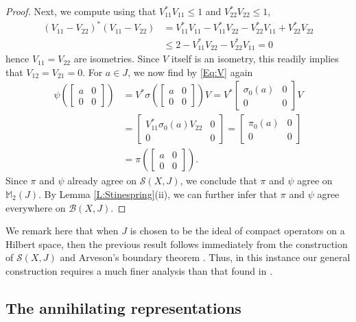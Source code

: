 \documentclass[10pt]{amsart}
\newcommand{\bM}{{\mathbb{M}}}
\newcommand{\B}{{\mathcal{B}}}
\renewcommand{\S}{{\mathcal{S}}}
\theoremstyle{definition}
\begin{document}
\begin{proof}
Next, we compute using that $V_{11}^*V_{11}\leq 1$ and $V_{22}^*V_{22}\leq 1$,
\begin{align*}
(V_{11}-V_{22})^*(V_{11}-V_{22})&=V_{11}^* V_{11}-V_{11}^* V_{22}-V_{22}^* V_{11}+V_{22}^* V_{22}\\
&\leq 2-V_{11}^* V_{22}-V_{22}^* V_{11}=0
\end{align*}
hence $V_{11}=V_{22}$ are isometries. Since $V$ itself is an isometry, this readily implies that $V_{12}=V_{21}=0$. For $a\in J$, we now find by \eqref{Eq:V} again
\begin{align*}
\psi\left(\begin{bmatrix} a & 0 \\ 0 & 0 \end{bmatrix} \right)&=V^* \sigma\left(\begin{bmatrix} a  & 0 \\ 0 & 0 \end{bmatrix}\right)V=V^* \begin{bmatrix} \sigma_0(a)& 0\\ 0 & 0 \end{bmatrix}V\\
&=\begin{bmatrix}
V_{11}^*\sigma_0(a)V_{22} & 0\\ 0 & 0
\end{bmatrix}=\begin{bmatrix}
\pi_0(a)& 0\\ 0 & 0
\end{bmatrix}\\
&=\pi\left(\begin{bmatrix} a & 0 \\ 0 & 0 \end{bmatrix} \right).
\end{align*}
Since $\pi$ and $\psi$ already agree on $\S(X,J)$, we conclude that $\pi$ and $\psi$ agree on $\bM_2(J)$. By Lemma \ref{L:Stinespring}(ii), we can further infer that $\pi$ and $\psi$ agree everywhere on $\B(X,J)$.
\end{proof}

We remark here that when $J$ is chosen to be the ideal of compact operators on a Hilbert space, then the previous result follows immediately from the construction of $\S(X,J)$ and Arveson's boundary theorem \cite{arveson1972}. Thus, in this instance our general construction requires a much finer analysis than that found in \cite{BDO2024}.

\subsection{The annihilating representations}
\end{document}
